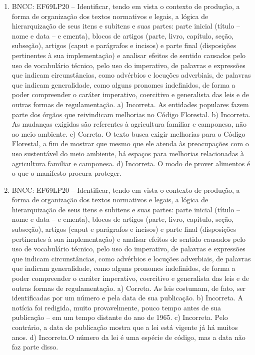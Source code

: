 
\begin{enumerate}
\item
BNCC: EF69LP20 -- Identificar, tendo em vista o contexto de produção, a
forma de organização dos textos normativos e legais, a lógica de
hierarquização de seus itens e subitens e suas partes: parte inicial
(título -- nome e data -- e ementa), blocos de artigos (parte, livro,
capítulo, seção, subseção), artigos (caput e parágrafos e incisos) e
parte final (disposições pertinentes à sua implementação) e analisar
efeitos de sentido causados pelo uso de vocabulário técnico, pelo uso do
imperativo, de palavras e expressões que indicam circunstâncias, como
advérbios e locuções adverbiais, de palavras que indicam generalidade,
como alguns pronomes indefinidos, de forma a poder compreender o caráter
imperativo, coercitivo e generalista das leis e de outras formas de
regulamentação. a) Incorreta. As entidades populares fazem parte dos órgãos que reivindicam melhorias no Código Florestal. b) Incorreta. As mudanças exigidas são referentes à agricultura familiar e camponesa, não ao meio ambiente. c) Correta. O texto busca exigir melhorias para o Código Florestal, a fim de mostrar que mesmo que ele atenda às preocupações com o uso sustentável do meio ambiente, há espaços para melhorias relacionadas à agricultura familiar e camponesa. d) Incorreta. O modo de prover alimentos é o que o manifesto procura proteger.

\item
BNCC: EF69LP20 -- Identificar, tendo em vista o contexto de produção, a
forma de organização dos textos normativos e legais, a lógica de
hierarquização de seus itens e subitens e suas partes: parte inicial
(título -- nome e data -- e ementa), blocos de artigos (parte, livro,
capítulo, seção, subseção), artigos (caput e parágrafos e incisos) e
parte final (disposições pertinentes à sua implementação) e analisar
efeitos de sentido causados pelo uso de vocabulário técnico, pelo uso do
imperativo, de palavras e expressões que indicam circunstâncias, como
advérbios e locuções adverbiais, de palavras que indicam generalidade,
como alguns pronomes indefinidos, de forma a poder compreender o caráter
imperativo, coercitivo e generalista das leis e de outras formas de
regulamentação. a) Correta. As leis costumam, de fato, ser identificadas por um número e pela data de sua publicação. b) Incorreta. A notícia foi redigida, muito provavelmente, pouco tempo antes de sua publicação -- em um tempo distante do ano de 1965. c) Incorreta. Pelo contrário, a data de publicação mostra que a lei está vigente já há muitos anos. d) Incorreta.O número da lei é uma espécie de código, mas a data não faz parte disso.


\end{enumerate}

